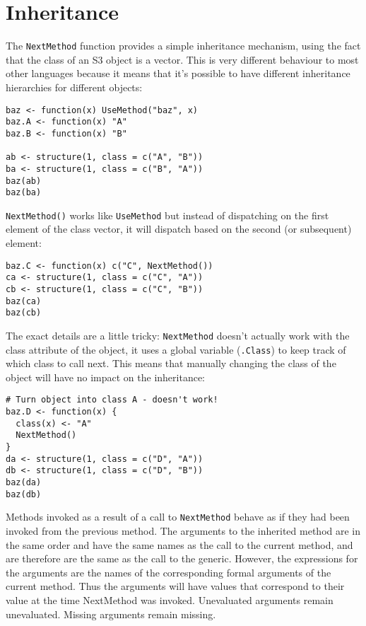 \hypertarget{inheritance}{%
\section{Inheritance}\label{inheritance}}

The \texttt{NextMethod} function provides a simple inheritance
mechanism, using the fact that the class of an S3 object is a vector.
This is very different behaviour to most other languages because it
means that it's possible to have different inheritance hierarchies for
different objects:

\begin{verbatim}
baz <- function(x) UseMethod("baz", x)
baz.A <- function(x) "A"
baz.B <- function(x) "B"

ab <- structure(1, class = c("A", "B"))
ba <- structure(1, class = c("B", "A"))
baz(ab)
baz(ba)
\end{verbatim}

\texttt{NextMethod()} works like \texttt{UseMethod} but instead of
dispatching on the first element of the class vector, it will dispatch
based on the second (or subsequent) element:

\begin{verbatim}
baz.C <- function(x) c("C", NextMethod())
ca <- structure(1, class = c("C", "A"))
cb <- structure(1, class = c("C", "B"))
baz(ca)
baz(cb)
\end{verbatim}

The exact details are a little tricky: \texttt{NextMethod} doesn't
actually work with the class attribute of the object, it uses a global
variable (\texttt{.Class}) to keep track of which class to call next.
This means that manually changing the class of the object will have no
impact on the inheritance:

\begin{verbatim}
# Turn object into class A - doesn't work!
baz.D <- function(x) {
  class(x) <- "A"
  NextMethod()
}
da <- structure(1, class = c("D", "A"))
db <- structure(1, class = c("D", "B"))
baz(da)
baz(db)
\end{verbatim}

Methods invoked as a result of a call to \texttt{NextMethod} behave as
if they had been invoked from the previous method. The arguments to the
inherited method are in the same order and have the same names as the
call to the current method, and are therefore are the same as the call
to the generic. However, the expressions for the arguments are the names
of the corresponding formal arguments of the current method. Thus the
arguments will have values that correspond to their value at the time
NextMethod was invoked. Unevaluated arguments remain unevaluated.
Missing arguments remain missing.

